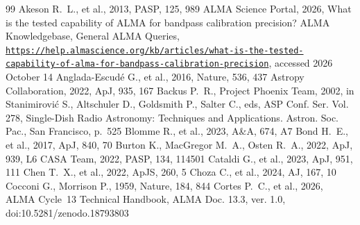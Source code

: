 \documentclass[twocolumn,twocolappendix,numberedappendix,appendixfloats]{openjournal}
\begin{document}
\begin{thebibliography}{99}
 Akeson R.~L., et al., 2013, PASP, 125, 989
 ALMA Science Portal, 2026, What is the tested capability of ALMA for bandpass calibration precision? ALMA Knowledgebase, General ALMA Queries, \href{https://help.almascience.org/kb/articles/what-is-the-tested-capability-of-alma-for-bandpass-calibration-precision}{\texttt{https://help.almascience.org/\allowbreak kb/\allowbreak articles/\allowbreak what-is-the-tested-\allowbreak capability-of-alma-for-\allowbreak bandpass-calibration-\allowbreak precision}}, accessed 2026 October 14
 Anglada-Escud\'e G., et al., 2016, Nature, 536, 437
 Astropy Collaboration, 2022, ApJ, 935, 167
 Backus P.~R., Project Phoenix Team, 2002, in Stanimirovi\'{c} S., Altschuler D., Goldsmith P., Salter C., eds, ASP Conf. Ser. Vol. 278, Single-Dish Radio Astronomy: Techniques and Applications. Astron. Soc. Pac., San Francisco, p.~525
 Blomme R., et al., 2023, A\&A, 674, A7
 Bond H.~E., et al., 2017, ApJ, 840, 70
 Burton K., MacGregor M.~A., Osten R.~A., 2022, ApJ, 939, L6
 CASA Team, 2022, PASP, 134, 114501
 Cataldi G., et al., 2023, ApJ, 951, 111
 Chen T.~X., et al., 2022, ApJS, 260, 5
 Choza C., et al., 2024, AJ, 167, 10
 Cocconi G., Morrison P., 1959, Nature, 184, 844
 Cortes P.~C., et al., 2026, ALMA Cycle~13 Technical Handbook, ALMA Doc. 13.3, ver. 1.0, doi:10.5281/zenodo.18793803

\end{thebibliography}
\end{document}
